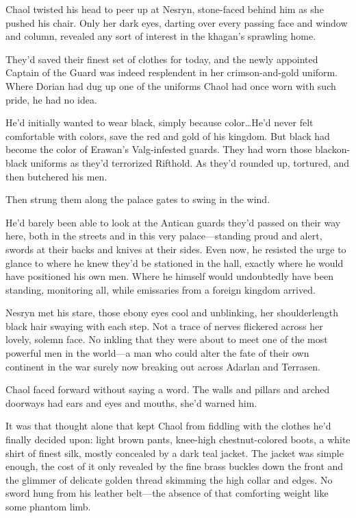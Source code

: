 Chaol twisted his head to peer up at Nesryn, stone-faced behind him as she pushed his chair. Only her dark eyes, darting over every passing face and window and column, revealed any sort of interest in the khagan's sprawling home.

They'd saved their finest set of clothes for today, and the newly appointed Captain of the Guard was indeed resplendent in her crimson-and-gold uniform. Where Dorian had dug up one of the uniforms Chaol had once worn with such pride, he had no idea.

He'd initially wanted to wear black, simply because color\ldots He'd never felt comfortable with colors, save the red and gold of his kingdom. But black had become the color of Erawan's Valg-infested guards. They had worn those blackon-black uniforms as they'd terrorized Rifthold. As they'd rounded up, tortured, and then butchered his men.

Then strung them along the palace gates to swing in the wind.

He'd barely been able to look at the Antican guards they'd passed on their way here, both in the streets and in this very palace---standing proud and alert, swords at their backs and knives at their sides. Even now, he resisted the urge to glance to where he knew they'd be stationed in the hall, exactly where he would have positioned his own men. Where he himself would undoubtedly have been standing, monitoring all, while emissaries from a foreign kingdom arrived.

Nesryn met his stare, those ebony eyes cool and unblinking, her shoulderlength black hair swaying with each step. Not a trace of nerves flickered across her lovely, solemn face. No inkling that they were about to meet one of the most powerful men in the world---a man who could alter the fate of their own continent in the war surely now breaking out across Adarlan and Terrasen.

Chaol faced forward without saying a word. The walls and pillars and arched doorways had ears and eyes and mouths, she'd warned him.

It was that thought alone that kept Chaol from fiddling with the clothes he'd finally decided upon: light brown pants, knee-high chestnut-colored boots, a white shirt of finest silk, mostly concealed by a dark teal jacket. The jacket was simple enough, the cost of it only revealed by the fine brass buckles down the front and the glimmer of delicate golden thread skimming the high collar and edges. No sword hung from his leather belt---the absence of that comforting weight like some phantom limb.

